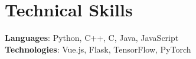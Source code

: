 \section{Technical Skills}
    \begin{itemize}[leftmargin=0.15in, label={}]
	\small{\item{
		\textbf{Languages}{: Python, C++, C, Java, JavaScript} \\
		\textbf{Technologies}{: Vue.js, Flask, TensorFlow, PyTorch} \\
	}}
    \end{itemize}